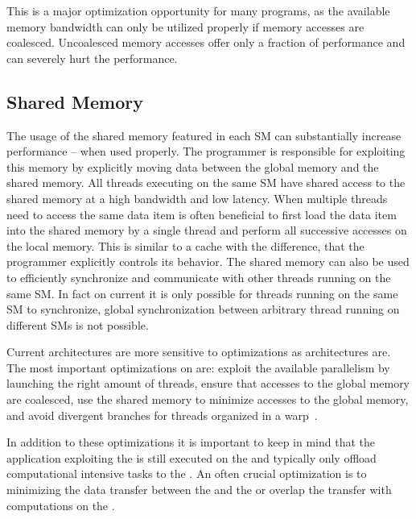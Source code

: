 This is a major optimization opportunity for many \GPU programs, as the available memory bandwidth can only be utilized properly if memory accesses are coalesced.
Uncoalesced memory accesses offer only a fraction of performance and can severely hurt the performance.


\subsection*{\GPU Shared Memory}
The usage of the shared memory featured in each SM can substantially increase performance -- when used properly.
The programmer is responsible for exploiting this memory by explicitly moving data between the global memory and the shared memory.
All threads executing on the same SM have shared access to the shared memory at a high bandwidth and low latency.
When multiple threads need to access the same data item is often beneficial to first load the data item into the shared memory by a single thread and perform all successive accesses on the local memory.
This is similar to a cache with the difference, that the programmer explicitly controls its behavior.
The shared memory can also be used to efficiently synchronize and communicate with other threads running on the same SM.
In fact on current \GPUs it is only possible for threads running on the same SM to synchronize, global synchronization between arbitrary thread running on different SMs is not possible.

\bigskip
Current \GPU architectures are more sensitive to optimizations as \CPU architectures are.
The most important optimizations on \GPUs are:
exploit the available parallelism by launching the right amount of threads, ensure that accesses to the global memory are coalesced, use the shared memory to minimize accesses to the global memory, and avoid divergent branches for threads organized in a warp~\cite{CUDATuningKepler2015}.

In addition to these optimizations it is important to keep in mind that the application exploiting the \GPU is still executed on the \CPU and typically only offload computational intensive tasks to the \GPU.
An often crucial optimization is to minimizing the data transfer between the \CPU and the \GPU or overlap the transfer with computations on the \GPU.

